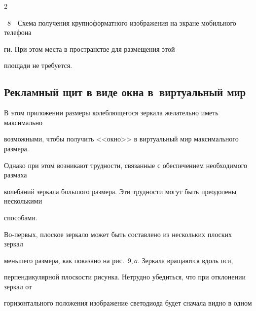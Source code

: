 \begin{multicols}{2}
\begin{center}
{}

\end{center}

\vspace*{2pt}

{{\figurename~8}\ \ \small{Схема получения крупноформатного изображения на экране мобильного телефона}}





\bigskip

\addtocounter{figure}{1}  





\noindent

ги. При этом места в пространстве для размещения этой 

площади не требуется. 



\vspace*{-4pt}



\subsection{Рекламный щит в виде окна в~виртуальный мир}



  В этом приложении размеры колеблющегося зеркала желательно иметь максимально 

возможными, чтобы получить <<окно>> в виртуальный мир максимального размера. 

Однако при этом возникают трудности, связанные с обеспечением необходимого размаха 

колебаний зеркала большого размера. Эти трудности могут быть преодолены несколькими 

способами. 

 

  

  Во-первых, плоское зеркало может быть со\-став\-ле\-но из нескольких плоских зеркал 

меньшего размера, как показано на рис.~9,\,\textit{а}. Зеркала вращаются  вдоль оси, 

перпендикулярной плоскости рисунка. Нетрудно убедиться, что при отклонении зеркал от 

горизонтального положения изображение светодиода будет сначала видно в одном 


\end{multicols}
